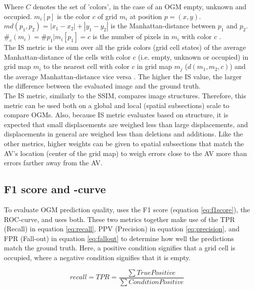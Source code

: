 Where $C$ denotes the set of 'colors', in the case of an \gls{OGM} empty, unknown and occupied. $m_i[p]$ is the color $c$ of grid $m_i$ at position $p=(x,y)$. $md(p_1,p_2) = |x_1 - x_2| + |y_1 - y_2|$ is the Manhattan-distance between $p_1$ and $p_2$. $\#_c(m_i) = \#{p_1|m_i[p_1] = c}$ is the number of pixels in $m_i$ with color $c$ \cite{birk1996learning}. \\
The \gls{IS} metric is the sum over all the grids colors (grid cell states) of the average Manhattan-distance of the cells with color $c$ (i.e. empty, unknown or occupied) in grid map $m_i$ to the nearest cell with color $c$ in grid map $m_j$ ($d(m_1, m_2,c)$) and the average Manhattan-distance vice versa \cite{birk1996learning}. The higher the \gls{IS} value, the larger the difference between the evaluated image and the ground truth. \\

The \gls{IS} metric, similarly to the \gls{SSIM}, compares image structures. Therefore, this metric can be used both on a global and local (spatial subsections) scale to compare \glspl{OGM}. Also, because \gls{IS} metric evaluates based on structure, it is expected that small displacements are weighed less than large displacements, and displacements in general are weighed less than deletions and additions. Like the other metrics, higher weights can be given to spatial subsections that match the \gls{AV}'s location (center of the grid map) to weigh errors close to the \gls{AV} more than errors farther away from the \gls{AV}.

\subsection{F1 score and -curve} \label{subsec:froc_met}
To evaluate \gls{OGM} prediction quality, \cite{dequaire2018deep} uses the F1 score (equation \ref{eq:f1score}), \cite{hoermann2018dynamic} the \gls{ROC}-curve, and \cite{schreiber2019long} uses both. These two metrics together make use of the \gls{TPR} (Recall) in equation \ref{eq:recall}, \gls{PPV} (Precision) in equation \ref{eq:precision}, and \gls{FPR} (Fall-out) in equation \ref{eq:fallout} to determine how well the predictions match the ground truth. Here, a positive condition signifies that a grid cell is occupied, where a negative condition signifies that it is empty.

\begin{equation} \label{eq:recall}
	recall = TPR = \frac{\sum True Positive}{\sum Condition Positive}
\end{equation}

